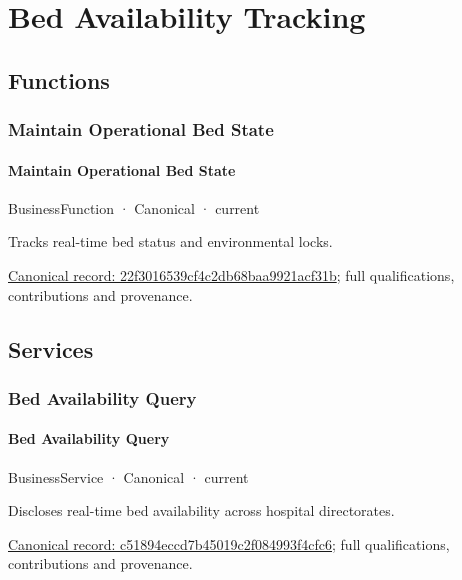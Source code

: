 \section{Bed Availability Tracking}

\subsection{Functions}

\subsubsection{Maintain Operational Bed State}

\paragraph{Maintain Operational Bed State}

\label{element:22f3016539cf4c2db68baa9921acf31b}
{\small BusinessFunction · Canonical · current}\par

Tracks real-time bed status and environmental locks.


{\footnotesize \href{../../../../continuum/business/business-function/22f3016539cf4c2db68baa9921acf31b.md}{Canonical record: 22f3016539cf4c2db68baa9921acf31b}; full qualifications, contributions and provenance.}\par
\subsection{Services}

\subsubsection{Bed Availability Query}

\paragraph{Bed Availability Query}

\label{element:c51894eccd7b45019c2f084993f4cfc6}
{\small BusinessService · Canonical · current}\par

Discloses real-time bed availability across hospital directorates.


{\footnotesize \href{../../../../continuum/business/business-service/c51894eccd7b45019c2f084993f4cfc6.md}{Canonical record: c51894eccd7b45019c2f084993f4cfc6}; full qualifications, contributions and provenance.}\par
